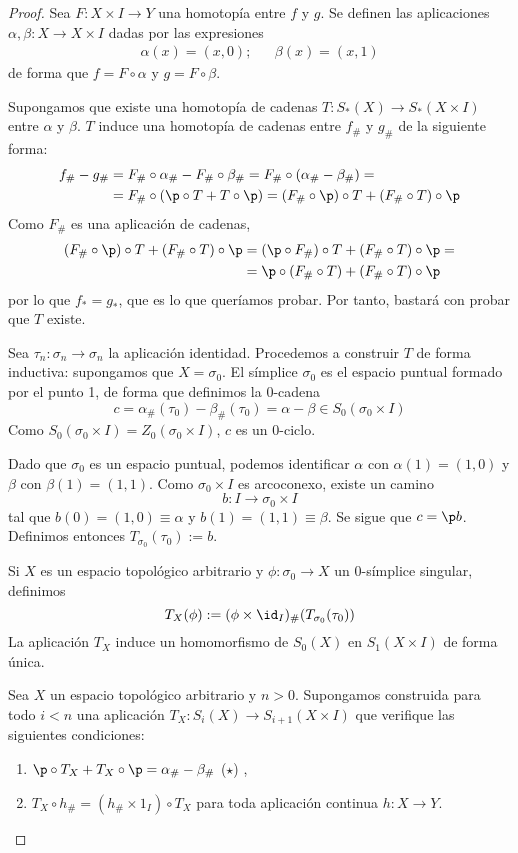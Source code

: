 \begin{proof}
Sea $F\colon X \times I \to Y$ una homotopía entre $f$ y $g$. Se definen las
aplicaciones $\alpha,\beta\colon X \to X\times I$ dadas por las expresiones
\begin{align*}
\alpha(x)=(x,0); && \beta(x)=(x,1)
\end{align*}
de forma que $f=F\circ \alpha$ y $g=F\circ \beta$.

Supongamos que existe una homotopía de cadenas $T\colon S_*(X) \to
S_*(X\times I)$ entre $\alpha$ y $\beta$. $T$ induce una homotopía de cadenas
entre $f_\#$ y $g_\#$ de la siguiente forma:
\begin{align*}
f_\#-g_\#&=F_\#\circ\alpha_\#-F_\#\circ\beta_\#=
	F_\#\circ(\alpha_\#-\beta_\#)=\\
	&=F_\#\circ(\p \circ T+T\circ\p)=
	(F_\#\circ\p)\circ T+(F_\#\circ T)\circ\p
\end{align*}
Como $F_\#$ es una aplicación de cadenas,
\begin{align*}
(F_\#\circ\p)\circ T+(F_\#\circ T)\circ\p&=
(\p\circ F_\#)\circ T+(F_\#\circ T)\circ\p=\\
&=\p\circ (F_\#\circ T)+(F_\#\circ T)\circ\p
\end{align*}
por lo que $f_*=g_*$, que es lo que queríamos probar. Por tanto, bastará con
probar que $T$ existe.

Sea $\tau_n\colon \sigma_n \to\sigma_n$ la aplicación identidad. Procedemos a
construir $T$ de forma inductiva: supongamos que $X=\sigma_0$. El símplice
$\sigma_0$ es el espacio puntual formado por el punto 1, de forma que definimos
la 0-cadena
\[c=\alpha_\#(\tau_0)-\beta_\#(\tau_0)=\alpha-\beta \in S_0(\sigma_0\times I)\]
Como $S_0(\sigma_0\times I)=Z_0(\sigma_0\times I)$, $c$ es un 0-ciclo.

Dado que $\sigma_0$ es un espacio puntual, podemos identificar $\alpha$ con
$\alpha(1)=(1,0)$ y $\beta$ con $\beta(1)=(1,1)$. Como $\sigma_0\times I$ es
arcoconexo, existe un camino
\[b\colon I \to \sigma_0\times I\]
tal que $b(0)=(1,0)\equiv \alpha$ y $b(1)=(1,1)\equiv\beta$. Se sigue que $c=
\p b$. Definimos entonces $T_{\sigma_0}(\tau_0):=b$.

Si $X$ es un espacio topológico arbitrario y $\phi\colon \sigma_0 \to X$ un
0-símplice singular, definimos
\[T_X(\phi):=(\phi \times \id_I)_\#(T_{\sigma_0}(\tau_0))\]
La aplicación $T_X$ induce un homomorfismo de $S_0(X)$ en $S_1(X\times I)$ de
forma única.

Sea $X$ un espacio topológico arbitrario y $n > 0$. Supongamos construida para
todo $i < n$ una aplicación $T_X: S_i(X) \to S_{i+1}(X\times I)$ que verifique las
siguientes condiciones:
\begin{enumerate}
\item $\p\circ T_X+T_X\circ\p=\alpha_\#-\beta_\#$ ($\star$) \label{AlfaBetaHomo},
\item $T_X\circ h_\#=(h_\#\times 1_I)\circ T_X$ para toda aplicación continua
$h\colon X \to Y$.
\end{enumerate}


\end{proof}
